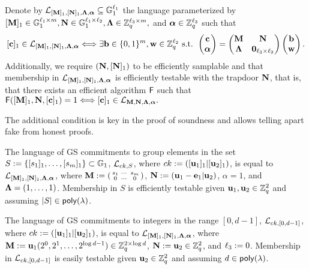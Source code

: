 \begin{definition}
Denote by $\mathcal{L}_{[\mathbf{{M}}]_1,[\mathbf{{N}}]_1,\mathbf{{\Lambda}},{\boldsymbol \alpha}}\subseteq\mathbb{G}_1^{\ell_1}$ the language parameterized by $[\mathbf{{M}}]_1 \in\mathbb{G}_1^{{\ell_1}\times {m}},\mathbf{{N}}\in\mathbb{G}_1^{{\ell_1}\times {\ell_2}},\mathbf{{\Lambda}}\in\mathbb{Z}_q^{{\ell_3}\times{m}},$ and ${\boldsymbol \alpha}\in\mathbb{Z}_q^{\ell_3}$ such that
\begin{equation}\label{eq:definition1}
[\mathbf{c}]_1\in\mathcal{L}_{[\mathbf{{M}}]_1,[\mathbf{{N}}]_1,\mathbf{{\Lambda}},{\boldsymbol \alpha}} \Longleftrightarrow \exists \mathbf{b}\in\{0,1\}^{m},\mathbf{w}\in\mathbb{Z}_q^{\ell_2} \text{ s.t. }
\left(\begin{matrix}
    \mathbf{c}\\
    {\boldsymbol \alpha}
\end{matrix}\right)
=
\begin{pmatrix}
    \mathbf{{M}}       & \mathbf{{N}}\\
    \mathbf{{\Lambda}} & \mathbf{{0}}_{{\ell_3}\times {\ell_2}}
\end{pmatrix}
\left(\begin{matrix}
    \mathbf{b}\\
    \mathbf{w}
\end{matrix}\right).
\end{equation}
Additionally, we require $(\mathbf{{N}},[\mathbf{{N}}]_1)$ to be efficiently samplable and that membership in $\mathcal{L}_{[\mathbf{{M}}]_1,[\mathbf{{N}}]_1,\mathbf{{\Lambda}},{\boldsymbol \alpha}}$ is efficiently testable with the trapdoor $\mathbf{{N}}$, that is, that there exists an efficient algorithm $\mathsf{F}$ such that $\mathsf{F}([\mathbf{{M}}]_1,\mathbf{{N}},[\mathbf{c}]_1)=1\Longleftrightarrow [\mathbf{c}]_1\in\mathcal{L}_{\mathbf{{M}},\mathbf{{N}},\mathbf{{\Lambda}},{\boldsymbol \alpha}}.$ 
\end{definition}
The additional condition is key in the proof of soundness and allows telling apart fake from honest proofs.
\begin{example}
The language of GS commitments to group elements in the set $S:=\{[s_1]_1,\ldots,[s_{m}]_1\} \subset \mathbb{G}_1$, $\mathcal{L}_{ck,S}$, where $ck:=([\mathbf{u}_1]_1|[\mathbf{u}_2]_1)$, is equal to $\mathcal{L}_{[\mathbf{{M}}]_1,[\mathbf{{N}}]_1,\mathbf{{\Lambda}},{\boldsymbol \alpha}}$, where
$\mathbf{{M}}:=\left(\begin{smallmatrix}s_1 & \cdots & s_{m} \\ 0 &\cdots & 0\end{smallmatrix}\right)$, $\mathbf{{N}}:=(\mathbf{u}_1-\mathbf{e}_1|\mathbf{u}_2)$, $\alpha=1$, and $\mathbf{{\Lambda}}=(1,\ldots,1)$. Membership in $S$ is efficiently testable given $\mathbf{u}_1,\mathbf{u}_2\in\mathbb{Z}_q^2$ and assuming $|S|\in\mathsf{poly}(\lambda)$.
\end{example}

\begin{example}
The language of GS commitments to integers in the range $[0,d-1]$, $\mathcal{L}_{ck,[0,d-1]}$, where $ck:=([\mathbf{u}_1]_1|[\mathbf{u}_2]_1)$, is equal to $\mathcal{L}_{[\mathbf{{M}}]_1,[\mathbf{{N}}]_1,\mathbf{{\Lambda}},{\boldsymbol \alpha}}$, where
$\mathbf{{M}}:=\mathbf{u}_1(2^0,2^1,\ldots,2^{\log d-1})\in\mathbb{Z}_q^{2\times \log d}$, $\mathbf{{N}}:=\mathbf{u}_2\in\mathbb{Z}_q^{2}$, and ${\ell_3}:=0$. Membership in $\mathcal{L}_{ck,[0,d-1]}$ is easily testable given $\mathbf{u}_2 \in \mathbb{Z}_q^2$ and assuming $d\in\mathsf{poly}(\lambda)$. 
\end{example}

